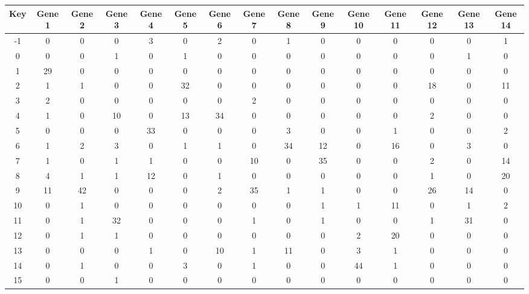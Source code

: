 \begin{tabular}{|c|c|c|c|c|c|c|c|c|c|c|c|c|c|c|}
\hline
Key & Gene 1 & Gene 2 & Gene 3 & Gene 4 & Gene 5 & Gene 6 & Gene 7 & Gene 8 & Gene 9 & Gene 10 & Gene 11 & Gene 12 & Gene 13 & Gene 14 \\
\hline
-1 & 0 & 0 & 0 & 3 & 0 & 2 & 0 & 1 & 0 & 0 & 0 & 0 & 0 & 1 \\
0 & 0 & 0 & 1 & 0 & 1 & 0 & 0 & 0 & 0 & 0 & 0 & 0 & 1 & 0 \\
1 & 29 & 0 & 0 & 0 & 0 & 0 & 0 & 0 & 0 & 0 & 0 & 0 & 0 & 0 \\
2 & 1 & 1 & 0 & 0 & 32 & 0 & 0 & 0 & 0 & 0 & 0 & 18 & 0 & 11 \\
3 & 2 & 0 & 0 & 0 & 0 & 0 & 2 & 0 & 0 & 0 & 0 & 0 & 0 & 0 \\
4 & 1 & 0 & 10 & 0 & 13 & 34 & 0 & 0 & 0 & 0 & 0 & 2 & 0 & 0 \\
5 & 0 & 0 & 0 & 33 & 0 & 0 & 0 & 3 & 0 & 0 & 1 & 0 & 0 & 2 \\
6 & 1 & 2 & 3 & 0 & 1 & 1 & 0 & 34 & 12 & 0 & 16 & 0 & 3 & 0 \\
7 & 1 & 0 & 1 & 1 & 0 & 0 & 10 & 0 & 35 & 0 & 0 & 2 & 0 & 14 \\
8 & 4 & 1 & 1 & 12 & 0 & 1 & 0 & 0 & 0 & 0 & 0 & 1 & 0 & 20 \\
9 & 11 & 42 & 0 & 0 & 0 & 2 & 35 & 1 & 1 & 0 & 0 & 26 & 14 & 0 \\
10 & 0 & 1 & 0 & 0 & 0 & 0 & 0 & 0 & 1 & 1 & 11 & 0 & 1 & 2 \\
11 & 0 & 1 & 32 & 0 & 0 & 0 & 1 & 0 & 1 & 0 & 0 & 1 & 31 & 0 \\
12 & 0 & 1 & 1 & 0 & 0 & 0 & 0 & 0 & 0 & 2 & 20 & 0 & 0 & 0 \\
13 & 0 & 0 & 0 & 1 & 0 & 10 & 1 & 11 & 0 & 3 & 1 & 0 & 0 & 0 \\
14 & 0 & 1 & 0 & 0 & 3 & 0 & 1 & 0 & 0 & 44 & 1 & 0 & 0 & 0 \\
15 & 0 & 0 & 1 & 0 & 0 & 0 & 0 & 0 & 0 & 0 & 0 & 0 & 0 & 0 \\
\hline
\end{tabular}